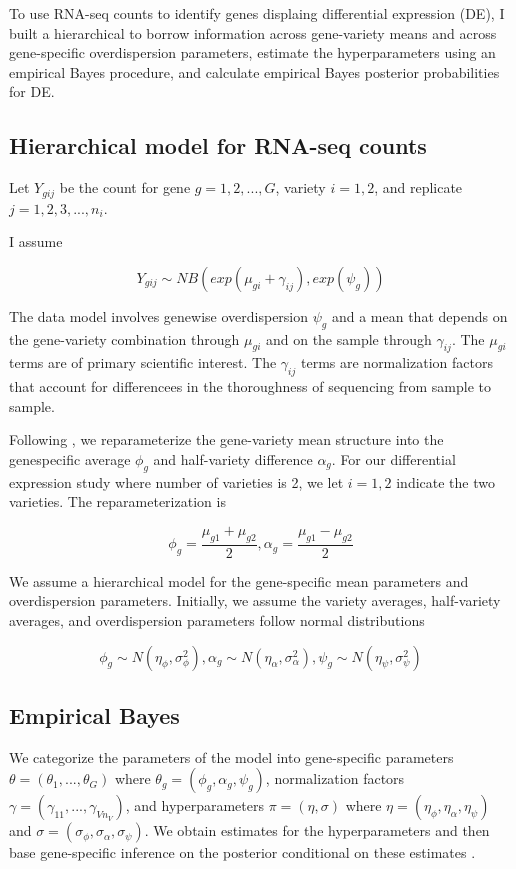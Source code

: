 \documentclass[11pt]{isuthesis}
\begin{document}
To use RNA-seq counts to identify genes displaing differential expression (DE), I built a hierarchical to borrow information across gene-variety means and across gene-specific overdispersion parameters, estimate the hyperparameters using an empirical Bayes procedure, and calculate empirical Bayes posterior probabilities for DE. 

\subsection{Hierarchical model for RNA-seq counts}

Let $Y_{gij}$ be the count for gene $g=1,2,..., G$, variety $i=1,2$, and replicate $j=1,2,3,...,n_i$.

I assume

\begin{equation}
\label{eq:1}
Y_{gij} \sim NB(exp(\mu_{gi}+\gamma_{ij}), exp(\psi_g))
\end{equation}

The data model involves genewise overdispersion $\psi_g$ and a mean that depends on the gene-variety combination through $\mu_{gi}$ and on the sample through $\gamma_{ij}$. The $\mu_{gi}$ terms are of primary scientific interest. The $\gamma_{ij}$ terms are normalization factors that account for differencees in the thoroughness of sequencing from sample to sample. 

Following \citep{ji2014estimation}, we reparameterize the gene-variety mean structure into the genespecific average $\phi_g$ and half-variety difference $\alpha_g$. For our differential expression study where number of varieties is 2, we let $i=1,2$ indicate the two varieties. The reparameterization is

$$\phi_g = \frac{\mu_{g1}+\mu_{g2}}{2}, \alpha_g = \frac{\mu_{g1}-\mu_{g2}}{2}$$

We assume a hierarchical model for the gene-specific mean parameters and overdispersion parameters. Initially, we assume the variety averages, half-variety averages, and overdispersion parameters follow normal distributions

$$\phi_g \sim N(\eta_\phi, \sigma^2_\phi), \alpha_g \sim N(\eta_\alpha , \sigma^2_\alpha), \psi_g \sim N(\eta_\psi, \sigma^2_\psi) $$

\subsection{Empirical Bayes}

We categorize the parameters of the model into gene-specific parameters $\theta = (\theta_1, ..., \theta_G)$ where $\theta_g = (\phi_g, \alpha_g, \psi_g)$, normalization factors $\gamma = (\gamma_{11}, ..., \gamma_{V n_V})$, and hyperparameters $\pi = (\eta, \sigma)$ where $\eta = (\eta_\phi, \eta_\alpha, \eta_\psi)$ and $\sigma = (\sigma_\phi, \sigma_\alpha, \sigma_\psi)$. We obtain estimates for the hyperparameters and then base gene-specific inference on the posterior conditional on these estimates \citep{niemi2015empirical}.
\end{document}
